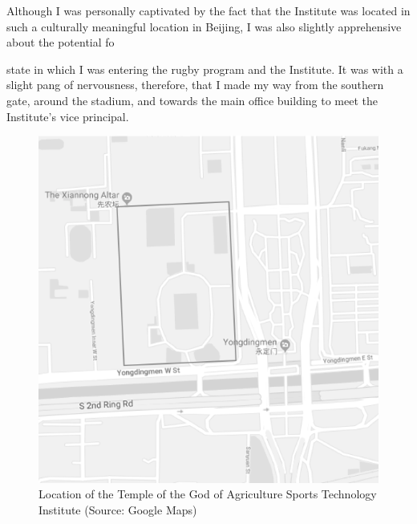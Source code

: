 \begin{CJK}{UTF8}{gbsn}
Although I was personally captivated by the fact that the Institute was located in such a culturally meaningful location in Beijing, I was also slightly apprehensive about the potential fo


 state in which I was entering the rugby program and the Institute.  It was with a slight pang of nervousness, therefore, that I made my way from the southern gate, around the stadium, and towards the main office building to meet the Institute's vice principal.

\begin{figure}[htbp]
  \centering
  \includegraphics[scale =.5]{images/beijingXNT.png}
  \caption{Location of the Temple of the God of Agriculture Sports Technology Institute  (Source: Google Maps)}
  \label{fig:beijingXNT}
\end{figure}



\end{CJK}
